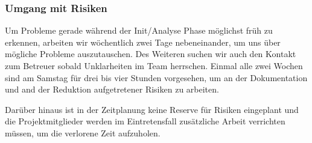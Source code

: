 \documentclass[]{subfiles}
\begin{document}
    \subsubsection{Umgang mit Risiken}
    Um Probleme gerade während der Init/Analyse Phase möglichst früh zu erkennen, 
	arbeiten wir wöchentlich zwei Tage nebeneinander, um uns über mögliche Probleme auszutauschen. 
	Des Weiteren suchen wir auch den Kontakt zum Betreuer sobald Unklarheiten im Team herrschen.
    Einmal alle zwei Wochen sind  am Samstag für drei bis vier Stunden vorgesehen,
    um an der Dokumentation und and der Reduktion aufgetretener Risiken zu arbeiten. 
    
    Darüber hinaus ist in der Zeitplanung keine Reserve für Risiken eingeplant und die 
    Projektmitglieder werden im Eintretensfall zusätzliche Arbeit verrichten müssen, 
    um die verlorene Zeit aufzuholen.
\end{document}
